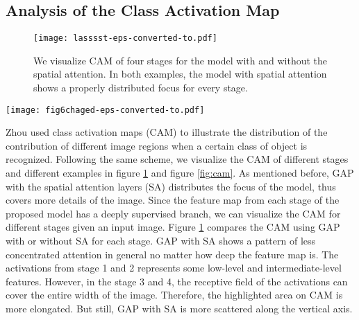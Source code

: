\documentclass[10pt,twocolumn,letterpaper]{article}
\begin{document}
\subsection{Analysis of the Class Activation Map}

\begin{figure}[!ht]
  \centering
  \texttt{[image: lasssst-eps-converted-to.pdf]}
  \caption{We visualize CAM of four stages for the model with and without the spatial attention. In both examples, the model with spatial attention shows a properly distributed focus for every stage.}
  \label{fig:stage_cam}
\end{figure}

\begin{figure*}[!ht]
  \centering
  \texttt{[image: fig6chaged-eps-converted-to.pdf]}
  \caption{Given a query image and two test images, (a) is taken from the same camera view with the query and (b) is from another one. The third column of each example shows the original class activation maps. The second column shows the class activation maps with the spatial attention. The failure cases are marked with a red box. All are taken from the stage 2.}
  \label{fig:cam}
\end{figure*}
Zhou \etal \cite{CAM} used class activation maps (CAM) to illustrate the distribution of the contribution of different image regions when a certain class of object is recognized. Following the same scheme, we visualize the CAM of different stages and different examples in figure \ref{fig:stage_cam} and figure \ref{fig:cam}. As mentioned before, GAP with the spatial attention layers (SA) distributes the focus of the model, thus covers more details of the image. Since the feature map from each stage of the proposed model has a deeply supervised branch, we can visualize the CAM for different stages given an input image. Figure \ref{fig:stage_cam} compares the CAM using GAP with or without SA for each stage. GAP with SA shows a pattern of less concentrated attention in general no matter how deep the feature map is. The activations from stage 1 and 2 represents some low-level and intermediate-level features. However, in the stage 3 and 4, the receptive field of the activations can cover the entire width of the image. Therefore, the highlighted area on CAM is more elongated. But still, GAP with SA is more scattered along the vertical axis.
\end{document}
